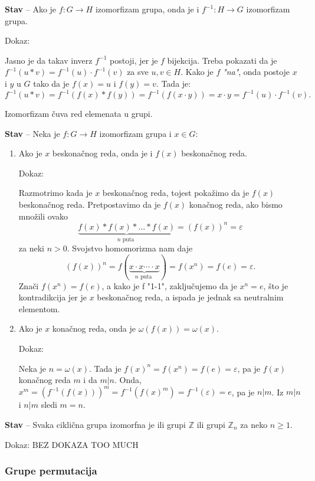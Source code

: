\documentclass[a4paper,12pt]{article}
\newcommand{\f}[1]{\(#1\)}
\begin{document}
\textbf{Stav} -- Ako je \f{f:G \rightarrow H} izomorfizam grupa, onda je i \f{f^{-1}:H \rightarrow G} izomorfizam grupa.

Dokaz:

Jasno je da takav inverz \f{f^{-1}} postoji, jer je \f{f} bijekcija. Treba pokazati da je \f{f^{-1}(u*v) = f^{-1}(u) \cdot f^{-1}(v)} za sve \f{u, v \in H}.
Kako je \f{f} \emph{"na"}, onda postoje \f{x} i \f{y} u \f{G} tako da je \f{f(x) = u} i \f{f(y) = v}. Tada je:
\[
f^{-1}(u*v) = f^{-1}(f(x) * f(y)) = f^{-1}(f(x \cdot y)) = x \cdot y = f^{-1}(u) \cdot f^{-1}(v).
\]


Izomorfizam čuva red elemenata u grupi.


\textbf{Stav} -- Neka je \f{f: G \rightarrow H} izomorfizam grupa i \f{x \in G}:
  \begin{enumerate}
  \item Ako je \f{x} beskonačnog reda, onda je i \f{f(x)} beskonačnog reda.
  
  Dokaz:

  Razmotrimo kada je \f{x} beskonačnog reda, tojest pokažimo da je \f{f(x)} beskonačnog reda.
  Pretpostavimo da je \f{f(x)} konačnog reda, ako bismo množili ovako 
  \[ 
  \underbrace{f(x)*f(x)*\dots*f(x)}_{n \text{ puta }} = (f(x))^n = \varepsilon
  \] za neki \f{n > 0}. Svojstvo homomorizma nam daje 
  \[
  (f(x))^n = f(\underbrace{x \cdot x \cdots \cdot x}_{n \text{ puta }}) = f(x^n) = f(e) = \varepsilon.
  \]
  Znači \f{f(x^n)=f(e)}, a kako je f "1-1", zaključujemo da je \f{x^n = e}, što je kontradikcija jer je \f{x} beskonačnog reda, a ispada je jednak sa neutralnim elementom.
  \item Ako je \f{x} konačnog reda, onda je \f{\omega(f(x)) = \omega(x)}.
  
  Dokaz:

  Neka je \f{n = \omega(x)}. Tada je \f{f(x)^n = f(x^n) = f(e) = \varepsilon}, pa je \f{f(x)} konačnog reda $m$ i da
  \f{m | n}. Onda, \f{x^m = (f^{-1}(f(x)))^m = f^{-1}(f(x)^m) = f^{-1}(\varepsilon) = e}, pa je \f{n | m}.
  Iz \f{m | n} i \f{n | m} sledi \f{m = n}.
  \end{enumerate}


  \textbf{Stav} -- Svaka ciklična grupa izomorfna je ili grupi \f{\mathbb{Z}} ili grupi \f{\mathbb{Z}_n} za neko \f{n \geq 1}.

  Dokaz:
  BEZ DOKAZA TOO MUCH

  \subsubsection{Grupe permutacija}
\end{document}
